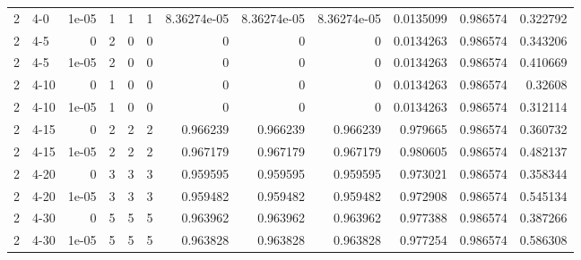 \begin{tabular}{rlrrrrrrrrrr}
     2 & 4-0    &      1e-05 &           1 &                 1 &                 1 &     8.36274e-05 &     8.36274e-05 &      8.36274e-05 &        0.0135099 &               0.986574 &           0.322792 \\
     2 & 4-5    &      0     &           2 &                 0 &                 0 &     0           &     0           &      0           &        0.0134263 &               0.986574 &           0.343206 \\
     2 & 4-5    &      1e-05 &           2 &                 0 &                 0 &     0           &     0           &      0           &        0.0134263 &               0.986574 &           0.410669 \\
     2 & 4-10   &      0     &           1 &                 0 &                 0 &     0           &     0           &      0           &        0.0134263 &               0.986574 &           0.32608  \\
     2 & 4-10   &      1e-05 &           1 &                 0 &                 0 &     0           &     0           &      0           &        0.0134263 &               0.986574 &           0.312114 \\
     2 & 4-15   &      0     &           2 &                 2 &                 2 &     0.966239    &     0.966239    &      0.966239    &        0.979665  &               0.986574 &           0.360732 \\
     2 & 4-15   &      1e-05 &           2 &                 2 &                 2 &     0.967179    &     0.967179    &      0.967179    &        0.980605  &               0.986574 &           0.482137 \\
     2 & 4-20   &      0     &           3 &                 3 &                 3 &     0.959595    &     0.959595    &      0.959595    &        0.973021  &               0.986574 &           0.358344 \\
     2 & 4-20   &      1e-05 &           3 &                 3 &                 3 &     0.959482    &     0.959482    &      0.959482    &        0.972908  &               0.986574 &           0.545134 \\
     2 & 4-30   &      0     &           5 &                 5 &                 5 &     0.963962    &     0.963962    &      0.963962    &        0.977388  &               0.986574 &           0.387266 \\
     2 & 4-30   &      1e-05 &           5 &                 5 &                 5 &     0.963828    &     0.963828    &      0.963828    &        0.977254  &               0.986574 &           0.586308 \\

\end{tabular}

